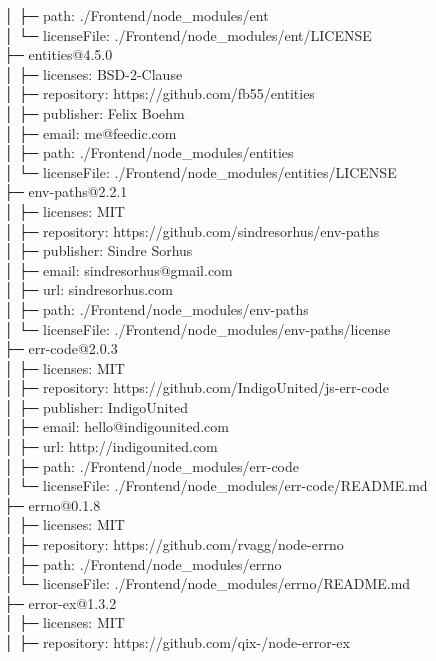 │  ├─ path: ./Frontend/node\_modules/ent\\
│  └─ licenseFile: ./Frontend/node\_modules/ent/LICENSE\\
├─ entities@4.5.0\\
│  ├─ licenses: BSD-2-Clause\\
│  ├─ repository: https://github.com/fb55/entities\\
│  ├─ publisher: Felix Boehm\\
│  ├─ email: me@feedic.com\\
│  ├─ path: ./Frontend/node\_modules/entities\\
│  └─ licenseFile: ./Frontend/node\_modules/entities/LICENSE\\
├─ env-paths@2.2.1\\
│  ├─ licenses: MIT\\
│  ├─ repository: https://github.com/sindresorhus/env-paths\\
│  ├─ publisher: Sindre Sorhus\\
│  ├─ email: sindresorhus@gmail.com\\
│  ├─ url: sindresorhus.com\\
│  ├─ path: ./Frontend/node\_modules/env-paths\\
│  └─ licenseFile: ./Frontend/node\_modules/env-paths/license\\
├─ err-code@2.0.3\\
│  ├─ licenses: MIT\\
│  ├─ repository: https://github.com/IndigoUnited/js-err-code\\
│  ├─ publisher: IndigoUnited\\
│  ├─ email: hello@indigounited.com\\
│  ├─ url: http://indigounited.com\\
│  ├─ path: ./Frontend/node\_modules/err-code\\
│  └─ licenseFile: ./Frontend/node\_modules/err-code/README.md\\
├─ errno@0.1.8\\
│  ├─ licenses: MIT\\
│  ├─ repository: https://github.com/rvagg/node-errno\\
│  ├─ path: ./Frontend/node\_modules/errno\\
│  └─ licenseFile: ./Frontend/node\_modules/errno/README.md\\
├─ error-ex@1.3.2\\
│  ├─ licenses: MIT\\
│  ├─ repository: https://github.com/qix-/node-error-ex\\
